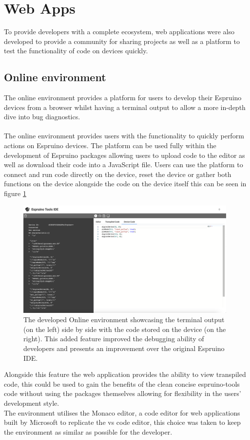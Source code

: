 \documentclass{l4proj}
\begin{document}
\section{Web Apps}
To provide developers with a complete ecosystem, web applications were also developed to provide a community for sharing projects as well as a platform to test the functionality of code on devices quickly.

\subsection{Online environment}
The online environment provides a platform for users to develop their Espruino devices from a browser whilst having a terminal output to allow a more in-depth dive into bug diagnostics.
\\ \\
The online environment provides users with the functionality to quickly perform actions on Espruino devices. The platform can be used fully within the development of Espruino packages allowing users to upload code to the editor as well as download their code into a JavaScript file. Users can use the platform to connect and run code directly on the device, reset the device or gather both functions on the device alongside the code on the device itself this can be seen in figure \ref{fig:online-env-device-code}

\begin{figure}[!ht]
    \centering
    \includegraphics[width=11cm]{dissertation/images/online-env-device-code.png}
    \caption{The developed Online environment showcasing the terminal output (on the left) side by side with the code stored on the device (on the right). This added feature improved the debugging ability of developers and presents an improvement over the original Espruino IDE.}
    \label{fig:online-env-device-code}
\end{figure}

Alongside this feature the web application provides the ability to view transpiled code, this could be used to gain the benefits of the clean concise espruino-tools code without using the packages themselves allowing for flexibility in the users' development style.
\\
The environment utilises the Monaco editor, a code editor for web applications built by Microsoft to replicate the vs code editor, this choice was taken to keep the environment as similar as possible for the developer.
\end{document}
